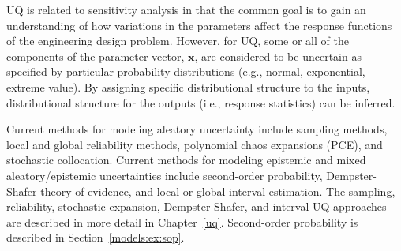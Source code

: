 UQ is related to sensitivity analysis in that the common goal is to
gain an understanding of how variations in the parameters affect the
response functions of the engineering design problem. However, for UQ,
some or all of the components of the parameter vector, $\mathbf{x}$,
are considered to be uncertain as specified by particular probability
distributions (e.g., normal, exponential, extreme value).  By
assigning specific distributional structure to the inputs,
distributional structure for the outputs (i.e., response statistics)
can be inferred.

Current methods for modeling aleatory uncertainty include sampling
methods, local and global reliability methods, polynomial chaos
expansions (PCE), and stochastic collocation.  Current methods for
modeling epistemic and mixed aleatory/epistemic uncertainties include
second-order probability, Dempster-Shafer theory of evidence, and
local or global interval estimation.  The sampling, reliability,
stochastic expansion, Dempster-Shafer, and interval UQ approaches are
described in more detail in Chapter~\ref{uq}.  Second-order
probability is described in Section~\ref{models:ex:sop}.


